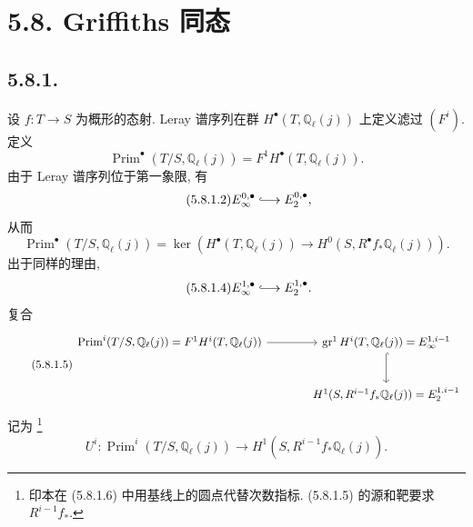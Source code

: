 \section*{5.8. Griffiths 同态}

\subsection*{5.8.1.}
设 $f:T\to S$ 为概形的态射. Leray 谱序列在群 $H^\bullet(T,\mathbb Q_\ell(j))$ 上定义滤过 $(F^i)$. 定义
\begin{equation}\tag{5.8.1.1}
\operatorname{Prim}^\bullet(T/S,\mathbb Q_\ell(j))
=F^1H^\bullet(T,\mathbb Q_\ell(j)).
\end{equation}
由于 Leray 谱序列位于第一象限, 有
\begin{equation}\tag{5.8.1.2}
E_\infty^{0,\bullet}\lhook\joinrel\longrightarrow E_2^{0,\bullet},
\end{equation}
从而
\begin{equation}\tag{5.8.1.3}
\operatorname{Prim}^\bullet(T/S,\mathbb Q_\ell(j))
=\ker\!\left(
H^\bullet(T,\mathbb Q_\ell(j))
\longrightarrow H^0(S,R^\bullet f_*\mathbb Q_\ell(j))
\right).
\end{equation}
出于同样的理由,
\begin{equation}\tag{5.8.1.4}
E_\infty^{1,\bullet}\lhook\joinrel\longrightarrow E_2^{1,\bullet}.
\end{equation}
复合
\begin{equation}\tag{5.8.1.5}
\begin{tikzcd}[column sep=large,row sep=large]
\operatorname{Prim}^i(T/S,\mathbb Q_\ell(j))
=F^1H^i(T,\mathbb Q_\ell(j))
  \arrow[r]
&
\operatorname{gr}^1H^i(T,\mathbb Q_\ell(j))
=E_\infty^{1,i-1}
  \arrow[d,hook]
\\
{}
&
H^1(S,R^{i-1}f_*\mathbb Q_\ell(j))
=E_2^{1,i-1}
\end{tikzcd}
\end{equation}
记为
\footnote{印本在 (5.8.1.6) 中用基线上的圆点代替次数指标. (5.8.1.5) 的源和靶要求 $R^{i-1}f_*$.}
\begin{equation}\tag{5.8.1.6}
U^i:\operatorname{Prim}^i(T/S,\mathbb Q_\ell(j))
\longrightarrow H^1(S,R^{i-1}f_*\mathbb Q_\ell(j)).
\end{equation}

